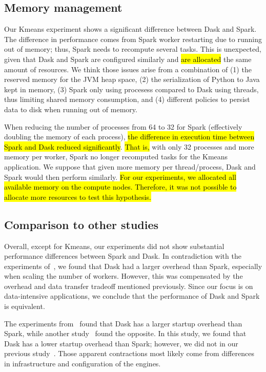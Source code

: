 \documentclass[AMA,STIX1COL]{WileyNJD-v2}
\newcommand{\HL}[1]{\hl{#1}}
\begin{document}
\subsection{Memory management}
Our Kmeans experiment shows a significant difference between Dask and Spark.
The difference in performance comes from Spark worker restarting due to running out of memory; thus, Spark needs to recompute several tasks.
This is unexpected, given that Dask and Spark are configured similarly and \HL{are allocated} the same amount of resources.
We think those issues arise from a combination of
(1) the reserved memory for the JVM heap space,
(2) the serialization of Python to Java kept in memory,
(3) Spark only using procesess compared to Dask using threads, thus limiting shared memory consumption,
and (4) different policies to persist data to disk when running out of memory.
										
When reducing the number of processes from 64 to 32 for Spark (effectively doubling the memory of each process), \HL{the difference in execution time between Spark and Dask reduced significantly}.
\HL{That is,} with only 32 processes and more memory per worker, Spark no longer recomputed tasks for the Kmeans application.
We suppose that given more memory per thread/process, Dask and Spark would then perform similarly.
\HL{For our experiments, we allocated all available memory on the compute nodes.
Therefore, it was not possible to allocate more resources to test this hypothesis.}
		
										
\subsection{Comparison to other studies}
Overall, except for Kmeans, our experiments did not show substantial performance differences between Spark and Dask.
In contradiction with the experiments of~\cite{Mehta:17}, we found that Dask had a larger overhead than Spark, especially when scaling the number of workers.
However, this was compensated by the overhead and data transfer tradeoff mentioned previously.
Since our focus is on data-intensive applications, we conclude that the performance of Dask and Spark is equivalent.
										
The experiments from~\cite{Mehta:17} found that Dask has a larger startup overhead than Spark, while another study~\cite{8588652} found the opposite.
In this study, we found that Dask has a lower startup overhead than Spark; however, we did not in our previous study~\cite{8943502}.
Those apparent contractions most likely come from differences in infrastructure and configuration of the engines.
										
\end{document}
